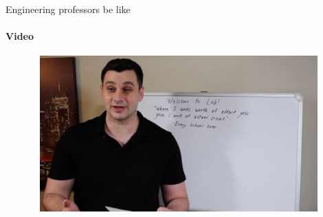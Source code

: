 \documentclass[aspectratio=169]{beamer}
\begin{document}
\begin{frame}[t]{Engineering professors be like}
    \framesubtitle{Video}
    \vspace{-0.6cm}
    \begin{figure}[H]
        \href{https://youtu.be/NS_Nk6mx1Rk?si=XDGARTeywTq-3MDS}{
            \centering\includegraphics[height=6cm,width=1\textwidth,keepaspectratio]{video2.jpg}}
        \label{fig:video2.jpg}
    \end{figure}
\end{frame}
\end{document}

